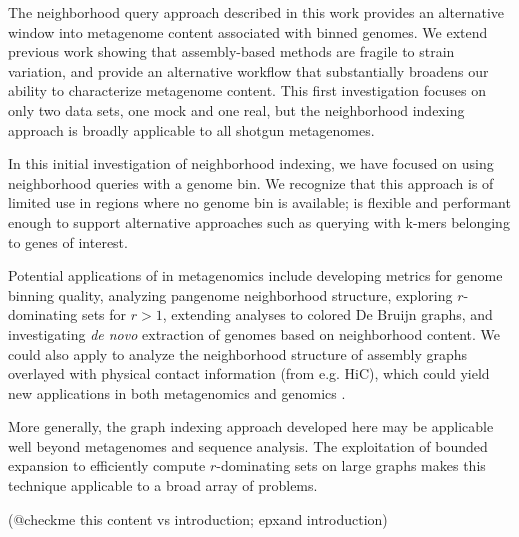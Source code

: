 The neighborhood query approach described in this work provides an
alternative window into metagenome content associated with binned genomes. We extend previous work
showing that assembly-based methods are fragile to strain
variation, and provide an alternative workflow that substantially
broadens our ability to characterize metagenome content.  This first
investigation focuses on only two data sets, one mock and one real, but
the neighborhood indexing approach is broadly applicable to
all shotgun metagenomes.

In this initial investigation of neighborhood indexing, we have
focused on using neighborhood queries with a genome bin.  We recognize
that this approach is of limited use in regions where no genome bin is
available; \sgc is flexible and performant enough to support
alternative approaches such as querying with k-mers belonging to genes
of interest.

Potential applications of \sgc in metagenomics include developing
metrics for genome binning quality, analyzing pangenome neighborhood
structure, exploring $r$-dominating sets for $r > 1$, extending analyses
to colored De Bruijn graphs, and investigating {\em de novo}
extraction of genomes based on neighborhood content.  We could also
apply \sgc to analyze the neighborhood structure of assembly graphs
overlayed with physical contact information (from e.g. HiC), which could
yield new applications in both metagenomics and genomics
\cite{Marbouty2014,Beitel2014}.

More generally, the graph indexing approach developed here may be
applicable well beyond metagenomes and sequence analysis.  The
exploitation of bounded expansion to efficiently compute $r$-dominating
sets on large graphs makes this technique applicable to a broad array
of problems.

(@checkme this content vs introduction; epxand introduction)
